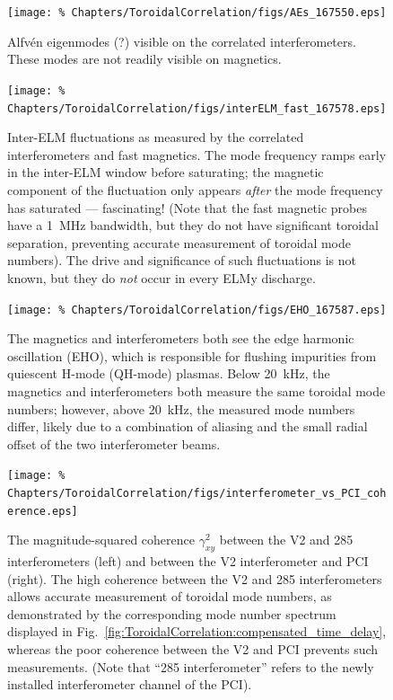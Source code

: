 \begin{figure}[h!]
  \centering
  \texttt{[image: \%
    Chapters/ToroidalCorrelation/figs/AEs\_167550.eps]}
  \caption{Alfv\'{e}n eigenmodes (?) visible
    on the correlated interferometers.
    These modes are not readily visible on magnetics.}
\label{fig:ToroidalCorrelation:AEs}
\end{figure}

\begin{figure}[h!]
  \centering
  \texttt{[image: \%
    Chapters/ToroidalCorrelation/figs/interELM\_fast\_167578.eps]}
  \caption{Inter-ELM fluctuations as measured by
    the correlated interferometers and fast magnetics.
    The mode frequency ramps early in the inter-ELM window before saturating;
    the magnetic component of the fluctuation only appears \emph{after}
    the mode frequency has saturated --- fascinating!
    (Note that the fast magnetic probes have a \SI{1}{\mega\hertz} bandwidth,
    but they do not have significant toroidal separation,
    preventing accurate measurement of toroidal mode numbers).
    The drive and significance of such fluctuations is not known, but
    they do \emph{not} occur in every ELMy discharge.}
\label{fig:ToroidalCorrelation:interELM_fast}
\end{figure}

\begin{figure}[h!]
  \centering
  \texttt{[image: \%
    Chapters/ToroidalCorrelation/figs/EHO\_167587.eps]}
  \caption{The magnetics and interferometers both see the
    edge harmonic oscillation (EHO), which is responsible for
    flushing impurities from quiescent H-mode (QH-mode) plasmas.
    Below \SI{20}{\kilo\hertz}, the magnetics and interferometers
    both measure the same toroidal mode numbers; however,
    above \SI{20}{\kilo\hertz}, the measured mode numbers differ,
    likely due to a combination of aliasing and the small radial offset
    of the two interferometer beams.}
\label{fig:ToroidalCorrelation:EHO}
\end{figure}

\begin{figure}[h!]
  \centering
  \texttt{[image: \%
    Chapters/ToroidalCorrelation/figs/interferometer\_vs\_PCI\_coherence.eps]}
  \caption[%
    Inability to correlate V2 and PCI]{%
      The magnitude-squared coherence $\gamma_{xy}^2$ between
      the V2 and 285 interferometers (left) and
      between the V2 interferometer and PCI (right).
      The high coherence between the V2 and 285 interferometers
      allows accurate measurement of toroidal mode numbers,
      as demonstrated by the corresponding mode number spectrum
      displayed in Fig.~\ref{fig:ToroidalCorrelation:compensated_time_delay},
      whereas the poor coherence between the V2 and PCI
      prevents such measurements.
      (Note that ``285 interferometer'' refers to
      the newly installed interferometer channel of the PCI).}
\label{fig:ToroidalCorrelation:PCI_coherence}
\end{figure}
